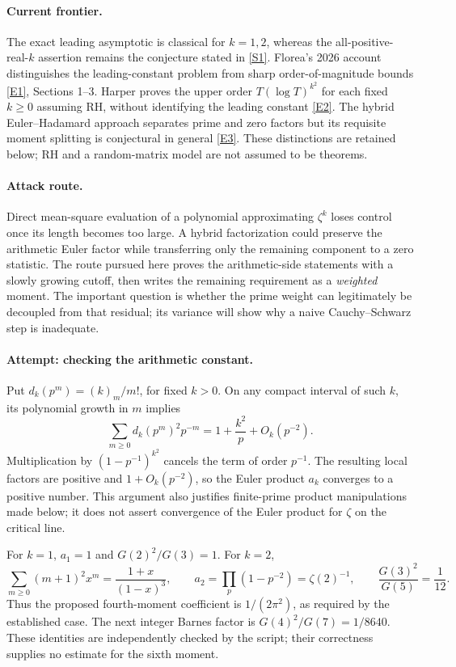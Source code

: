\documentclass[11pt,a4paper]{article}
\newcommand{\sref}[2]{\hyperlink{source:#1:#2}{[S#2]}}
\newcommand{\eref}[2]{\hyperlink{extra:#1:#2}{[E#2]}}
\numberwithin{equation}{section}
\begin{document}
\paragraph{Current frontier.}
The exact leading asymptotic is classical for $k=1,2$, whereas the
all-positive-real-$k$ assertion remains the conjecture stated in
\sref{statement}{1}. Florea's 2026 account distinguishes the leading-constant
problem from sharp order-of-magnitude bounds \eref{statement}{1}, Sections
1--3. Harper proves the upper order $T(\log T)^{k^2}$ for each fixed
$k\ge0$ assuming RH, without identifying the leading constant
\eref{statement}{2}. The hybrid Euler--Hadamard approach separates prime and
zero factors but its requisite moment splitting is conjectural in general
\eref{statement}{3}. These distinctions are retained below; RH and a
random-matrix model are not assumed to be theorems.

\paragraph{Attack route.}
Direct mean-square evaluation of a polynomial approximating $\zeta^k$
loses control once its length becomes too large. A hybrid factorization
could preserve the arithmetic Euler factor while transferring only the
remaining component to a zero statistic. The route pursued here proves
the arithmetic-side statements with a slowly growing cutoff, then writes
the remaining requirement as a \emph{weighted} moment. The important
question is whether the prime weight can legitimately be decoupled from
that residual; its variance will show why a naive Cauchy--Schwarz step
is inadequate.

\paragraph{Attempt: checking the arithmetic constant.}
Put $d_k(p^m)=(k)_m/m!$, for fixed $k>0$. On any compact interval of
such $k$, its polynomial growth in $m$ implies
\[
 \sum_{m\ge0}d_k(p^m)^2p^{-m}=1+\frac{k^2}{p}+O_k(p^{-2}).
\]
Multiplication by $(1-p^{-1})^{k^2}$ cancels the term of order $p^{-1}$.
The resulting local factors are positive and $1+O_k(p^{-2})$, so the
Euler product $a_k$ converges to a positive number. This argument also
justifies finite-prime product manipulations made below; it does not
assert convergence of the Euler product for $\zeta$ on the critical line.

For $k=1$, $a_1=1$ and $G(2)^2/G(3)=1$. For $k=2$,
\[
 \sum_{m\ge0}(m+1)^2x^m=\frac{1+x}{(1-x)^3},\qquad
 a_2=\prod_p(1-p^{-2})=\zeta(2)^{-1},
 \qquad\frac{G(3)^2}{G(5)}=\frac1{12}.
\]
Thus the proposed fourth-moment coefficient is $1/(2\pi^2)$, as required
by the established case. The next integer Barnes factor is
$G(4)^2/G(7)=1/8640$. These identities are independently checked by the
script; their correctness supplies no estimate for the sixth moment.
\end{document}
